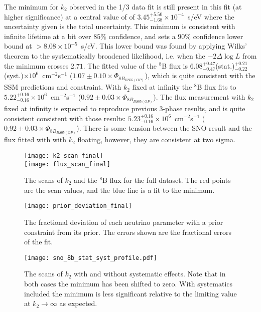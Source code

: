 The minimum for $k_2$ observed in the 1/3 data fit is still present in this fit (at higher significance) at a central value of of $3.45^{+5.50}_{-1.68}\times10^{-4}$~s/eV where the uncertainty given is the total uncertainty.
This minimum is consistent with infinite lifetime at a bit over $85\%$ confidence, and sets a $90\%$ confidence lower bound at $>8.08\times10^{-5}$~s/eV.
This lower bound was found by applying Wilks' theorem to the systematically broadened likelihood, i.e. when the $-2\Delta\log{L}$ from the minimum crosses $2.71$.
The fitted value of the $^8$B flux is $6.08^{+0.47}_{-0.47}$(stat.)$^{+0.21}_{-0.22}$(syst.)$\times10^6$~cm$^{-2}$s$^{-1}$ ($1.07\pm0.10 \times \Phi_{8B_{BS05(OP)}}$), which is quite consistent with the SSM predictions and constraint.
With $k_2$ fixed at infinity the $^8$B flux fits to $5.22^{+0.16}_{-0.16}\times10^6$~cm$^{-2}$s$^{-1}$ ($0.92\pm0.03 \times \Phi_{8B_{BS05(OP)}}$).
The flux measurement with $k_2$ fixed at infinity is expected to reproduce previous 3-phase results, and is quite consistent consistent with those results: $5.23^{+0.16}_{-0.16}\times10^6$~cm$^{-2}$s$^{-1}$ ($0.92\pm0.03 \times \Phi_{8B_{BS05(OP)}}$).
There is some tension between the SNO result and the flux fitted with with $k_2$ floating, however, they are consistent at two sigma. 

\begin{figure}
\centering
\texttt{[image: k2\_scan\_final]} \\
\vspace{12pt}
\texttt{[image: flux\_scan\_final]}
\caption{The scans of $k_2$ and the $^8$B flux for the full dataset. The red points are the scan values, and the blue line is a fit to the minimum.}
\label{fig:final_scans}
\end{figure}

\begin{figure}
\centering
\texttt{[image: prior\_deviation\_final]}
\caption{The fractional deviation of each neutrino parameter with a prior constraint from its prior. The errors shown are the fractional errors of the fit.}
\label{fig:priors_final}
\end{figure}

\begin{figure}
\centering
\texttt{[image: sno\_8b\_stat\_syst\_profile.pdf]}
\caption{The scans of $k_2$ with and without systematic effects. Note that in both cases the minimum has been shifted to zero. With systematics included the minimum is less significant relative to the limiting value at $k_2 \rightarrow \infty$ as expected.}
\label{fig:systematic_scans}
\end{figure}

